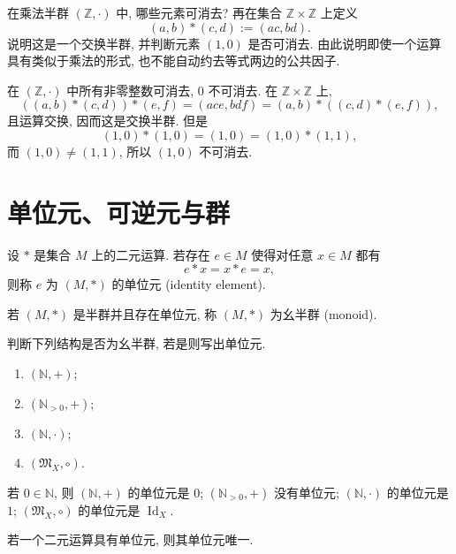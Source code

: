 \documentclass[usesamecnt, thmcnt=section, lang=cn, newtx, 10pt, scheme=chinese]{elegantbook}
\begin{document}
\begin{concept}\label{con:alg-cancel-01}
在乘法半群 $(\mathbb Z,\cdot)$ 中, 哪些元素可消去? 再在集合 $\mathbb Z\times\mathbb Z$ 上定义
\[
 (a,b)*(c,d):=(ac,bd).
\]
说明这是一个交换半群, 并判断元素 $(1,0)$ 是否可消去. 由此说明即使一个运算具有类似于乘法的形式, 也不能自动约去等式两边的公共因子.
\end{concept}

\begin{solution}
在 $(\mathbb Z,\cdot)$ 中所有非零整数可消去, $0$ 不可消去. 在 $\mathbb Z\times\mathbb Z$ 上,
\[
 ((a,b)*(c,d))*(e,f)
 =(ace,bdf)
 =(a,b)*((c,d)*(e,f)),
\]
且运算交换, 因而这是交换半群. 但是
\[
 (1,0)*(1,0)=(1,0)=(1,0)*(1,1),
\]
而 $(1,0)\neq(1,1)$, 所以 $(1,0)$ 不可消去.
\end{solution}

\section{单位元、可逆元与群}



\begin{definition}[单位元与幺半群]\label{def:alg-monoid}
设 $*$ 是集合 $M$ 上的二元运算. 若存在 $e\in M$ 使得对任意 $x\in M$ 都有
\[
 e*x=x*e=x,
\]
则称 $e$ 为 $(M,*)$ 的{\color{blue}单位元 (identity element)}.

若 $(M,*)$ 是半群并且存在单位元, 称 $(M,*)$ 为{\color{blue}幺半群 (monoid)}.
\end{definition}

\begin{concept}\label{con:alg-monoid-01}
判断下列结构是否为幺半群, 若是则写出单位元.
\begin{enumerate}[label=\rm(\arabic*)]
  \item $(\mathbb N,+)$;
  \item $(\mathbb N_{>0},+)$;
  \item $(\mathbb N,\cdot)$;
  \item $(\mathfrak M_X,\circ)$.
\end{enumerate}
\end{concept}

\begin{solution}
若 $0\in\mathbb N$, 则 $(\mathbb N,+)$ 的单位元是 $0$; $(\mathbb N_{>0},+)$ 没有单位元; $(\mathbb N,\cdot)$ 的单位元是 $1$; $(\mathfrak M_X,\circ)$ 的单位元是 $\operatorname{Id}_X$.
\end{solution}

\begin{proposition}\label{prop:alg-identity-unique}
若一个二元运算具有单位元, 则其单位元唯一.
\end{proposition}
\end{document}
